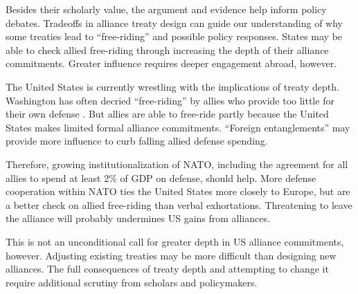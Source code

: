 \documentclass[12pt]{article}
\begin{document}
Besides their scholarly value, the argument and evidence help inform policy debates. 
Tradeoffs in alliance treaty design can guide our understanding of why some treaties lead to ``free-riding'' and possible policy responses. 
States may be able to check allied free-riding through increasing the depth of their alliance commitments. 
Greater influence requires deeper engagement abroad, however. 


The United States is currently wrestling with the implications of treaty depth. 
Washington has often decried ``free-riding'' by allies who provide too little for their own defense \citep{Lanoszka2015}. 
But allies are able to free-ride partly because the United States makes limited formal alliance commitments. 
``Foreign entanglements'' may provide more influence to curb falling allied defense spending. 

 
Therefore, growing institutionalization of NATO, including the agreement for all allies to spend at least 2\% of GDP on defense, should help.
More defense cooperation within NATO ties the United States more closely to Europe, but are a better check on allied free-riding than verbal exhortations. 
Threatening to leave the alliance will probably undermines US gains from alliances. 

 
This is not an unconditional call for greater depth in US alliance commitments, however. 
Adjusting existing treaties may be more difficult than designing new alliances. 
The full consequences of treaty depth and attempting to change it require additional scrutiny from scholars and policymakers. 

 



\singlespace
 
 
\end{document}
